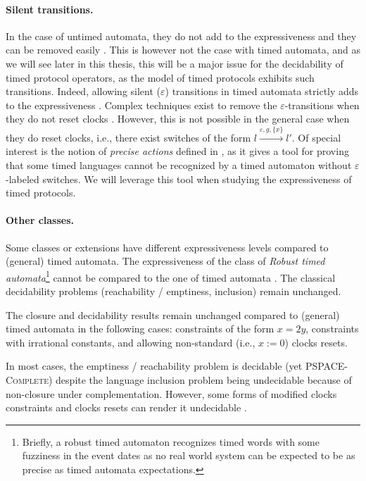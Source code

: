 \paragraph{Silent transitions.}
In the case of untimed automata, they do not add to the expressiveness and they can be removed easily \cite{Hopcroft79}. This is however not the case with timed automata, and as we will see later in this thesis, this will be a major issue for the decidability of timed protocol operators, as the model of timed protocols exhibits such transitions. Indeed, allowing silent ($\varepsilon$) transitions in timed automata strictly adds to the expressiveness \cite{VDPG97,BBVD+99,LSV:07:12}. Complex techniques exist to remove the $\varepsilon$-transitions when they do not reset clocks \cite{VDPG97}. However, this is not possible in the general case when they do reset clocks, i.e., there exist switches of the form $l \xrightarrow{\varepsilon, g, \{ x \}} l'$. Of special interest is the notion of \emph{precise actions} defined in \cite{BBVD+99}, as it gives a tool for proving that some timed languages cannot be recognized by a timed automaton without $\varepsilon$-labeled switches. We will leverage this tool when studying the expressiveness of timed protocols.

\paragraph{Other classes.}
Some classes or extensions have different expressiveness levels compared to (general) timed automata. The expressiveness of the class of \emph{Robust timed automata}\footnote{Briefly, a robust timed automaton recognizes  timed words with some fuzziness in the event dates as no real world system can be expected to be as precise as timed automata expectations.} cannot be compared to the one of timed automata \cite{RAPM04}. The classical decidability problems (reachability / emptiness, inclusion) remain unchanged.

The closure and decidability results remain unchanged compared to (general) timed automata in the following cases: constraints of the form $x = 2y$, constraints with irrational constants, and allowing non-standard (i.e., $x := 0$) clocks resets.

In most cases, the emptiness / reachability problem is decidable (yet \textsc{PSPACE-Complete}) despite the language inclusion problem being undecidable because of non-closure under complementation. However, some forms of modified clocks constraints and clocks resets can render it undecidable \cite{BerDuf-IPL2000,RADLD94,Miller00,BDFP04,BBVD+99,LSV:07:12,VDPG97}.

